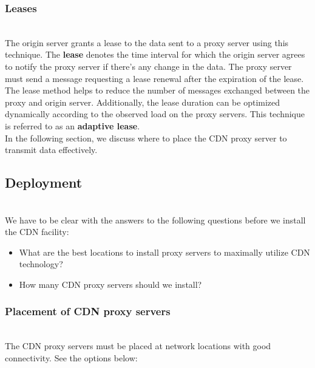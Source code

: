 \subsubsection{Leases}\label{Uzk4dLpUq5Jes3gFHnTzq}
\\
The origin server grants a lease to the data sent to a proxy server using this technique. The \textbf{lease} denotes the time interval for which the origin server agrees to notify the proxy server if there's any change in the data. The proxy server must send a message requesting a lease renewal after the expiration of the lease. The lease method helps to reduce the number of messages exchanged between the proxy and origin server. Additionally, the lease duration can be optimized dynamically according to the observed load on the proxy servers. This technique is referred to as an \textbf{adaptive lease}.
\\
In the following section, we discuss where to place the CDN proxy server to transmit data effectively.

\subsection{Deployment}\label{vf7jZLq1carBBBFYJr5fQ}
\\
We have to be clear with the answers to the following questions before we install the CDN facility:

\begin{itemize}
\item
\protect{}\label{woosKwbJoaysxSt8GPbzw}
What are the best locations to install proxy servers to maximally utilize CDN technology?
\item
\protect{}\label{k9sQwqUUrjnqJsO9fCXtx}
How many CDN proxy servers should we install?
\end{itemize}

\subsubsection{Placement of CDN proxy servers}\label{f70Q90KpxmLEzs43T9v5R}
\\
The CDN proxy servers must be placed at network locations with good connectivity. See the options below:

